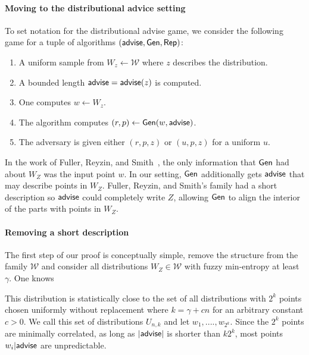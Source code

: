 \paragraph{Moving to the distributional advice setting}
To set notation for the distributional advise game, we consider the following game for a tuple of algorithms $({\mathsf{advise}}, {\mathsf{Gen}}, {\mathsf{Rep}})$:
\begin{enumerate}
\itemsep0em
\item A uniform sample from $W_z\leftarrow \mathcal{W}$ where $z$ describes the distribution.
\item A bounded length ${\mathsf{advise}} = {\mathsf{advise}}(z)$ is computed.
\item One computes $w\leftarrow W_z$.
\item The algorithm computes $(r, p)\leftarrow {\ensuremath{\mathsf{Gen}}}(w, {\mathsf{advise}})$.
\item The adversary is given either $(r, p, z)$ or $(u, p, z)$ for a uniform $u$.
\end{enumerate}

In the work of Fuller, Reyzin, and Smith~\cite{fuller2020computational}, the only information that ${\mathsf{Gen}}$ had about $W_Z$ was the input point $w$.  In our setting, ${\mathsf{Gen}}$ additionally gets ${\mathsf{advise}}$ that may describe points in $W_Z$.  Fuller, Reyzin, and Smith's family had a short description so ${\mathsf{advise}}$ could completely write $Z$, allowing ${\mathsf{Gen}}$ to align the interior of the parts with points in $W_Z$.  

\paragraph{Removing a short description}
The first step of our proof is conceptually simple, remove the structure from the family $\mathcal{W}$ and consider all distributions $W_Z\in\mathcal{W}$ with fuzzy min-entropy at least $\gamma$.  One knows 

This distribution is statistically close to the set of all distributions with $2^k$ points chosen uniformly without replacement where $k = \gamma +cn$ for an arbitrary constant $c>0$.  We call this set of distributions $U_{n,k}$ and let $w_1,...., w_{2^k}$.  Since the  $2^k$ points are minimally correlated, as long as $|{\mathsf{advise}}|$ is shorter than $k2^k$, most points $w_i | {\mathsf{advise}}$ are unpredictable.  

